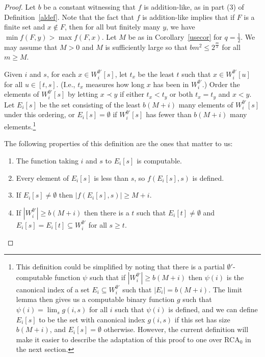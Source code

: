 \documentclass{amsart}
\theoremstyle{definition}
\renewcommand{\leq}{\leqslant}
\renewcommand{\geq}{\geqslant}
\begin{document}
\begin{proof}
Let $b$ be a constant witnessing that $f$ is addition-like, as in part
(3) of Definition~\ref{aldef}. Note that the fact that $f$ is
addition-like implies that if $F$ is a finite set and $x \notin F$,
then for all but finitely many $y$, we have $\min f(F,y) > \max
f(F,x)$. Let $M$ be as in Corollary~\ref{usecor} for
$q=\frac{1}{2}$. We may assume that $M>0$ and $M$ is sufficiently
large so that $bm^2 \leq 2^{\frac{m}{2}}$ for all $m \geq
M$.

Given $i$ and $s$, for each $x \in W^{\emptyset'}_i[s]$, let $t_x$ be
the least $t$ such that $x \in W^{\emptyset'}_i[u]$ for all $u \in
[t,s]$. (I.e., $t_x$ measures how long $x$ has been in
$W^{\emptyset'}_i$.) Order the elements of $W^{\emptyset'}_i[s]$ by
letting $x \prec y$ if either $t_x<t_y$ or both $t_x=t_y$ and
$x<y$. Let $E_i[s]$ be the set consisting of the least $b(M+i)$ many
elements of $W^{\emptyset'}_i[s]$ under this ordering, or
$E_i[s]=\emptyset$ if $W^{\emptyset'}_i[s]$ has fewer than $b(M+i)$ many
elements.\footnote{This definition could be simplified by noting that
there is a partial $\emptyset'$-computable function $\psi$ such that
if $|W^{\emptyset'}_i| \geq b(M+i)$ then $\psi(i)$ is the canonical
index of a set $E_i \subseteq W^{\emptyset'}_i$ such that
$|E_i|=b(M+i)$. The limit lemma then gives us a computable binary
function $g$ such that $\psi(i)=\lim_s g(i,s)$ for all $i$ such that
$\psi(i)$ is defined, and we can define $E_i[s]$ to be the set with
canonical index $g(i,s)$ if this set has size $b(M+i)$, and
$E_i[s]=\emptyset$ otherwise. However, the current definition will
make it easier to describe the adaptation of this proof to one over
RCA$_0$ in the next section.}

The following properties of this definition are the ones that matter
to us:
\begin{enumerate}

\item The function taking $i$ and $s$ to $E_i[s]$ is computable. 

\item Every element of $E_i[s]$ is less than $s$, so $f(E_i[s],s)$ is
defined.

\item If $E_i[s] \neq \emptyset$ then $|f(E_i[s],s)| \geq M+i$.

\item If $|W^{\emptyset'}_i| \geq b(M+i)$ then there
is a $t$ such that $E_i[t] \neq \emptyset$ and $E_i[s]=E_i[t]
\subseteq W^{\emptyset'}_i$ for all $s \geq t$.


\end{enumerate}
\end{proof}
\end{document}
